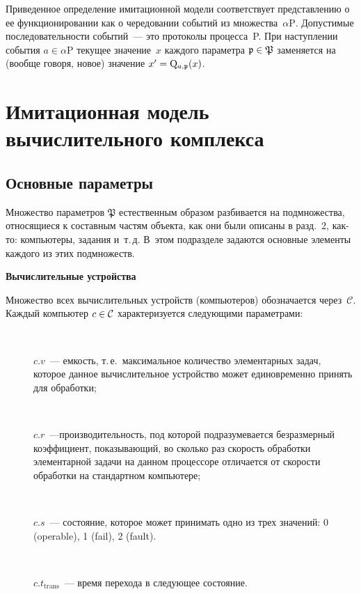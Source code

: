 \begin{multicols}{2}
    Приведенное определение имитационной модели соответствует 
представлению о ее функ\-ци\-онировании как о чередовании событий из 
мно\-жества~$\alpha \mathrm{P}$. Допустимые последовательности\linebreak 
    \mbox{событий}~--- это протоколы процесса~P. При наступлении события 
$a\in \alpha\mathrm{P}$ текущее значение~$x$ каждого параметра 
$\mathfrak{p}\hm\in\mathfrak{P}$ заменяется на (вообще говоря, новое) 
значение $x^\prime\hm=\mathrm{Q}_{a,\mathfrak{p}}(x)$.

\section{Имитационная модель вычислительного комплекса}

\subsection{Основные параметры}
    
    Множество параметров $\mathfrak{P}$ естественным образом 
разбивается на подмножества, относящиеся к составным частям объекта, как 
они были описаны в разд.~2, как-то: компьютеры, задания и~т.\,д. В~этом 
подразделе задаются основные элементы каждого из этих подмножеств.

\medskip
\textbf{Вычислительные устройства}
\smallskip

    Множество всех вычислительных устройств (компьютеров) 
обозначается через~$\mathcal{C}$. Каждый компьютер $c\hm\in \mathcal{C}$ характеризуется 
следующими па\-ра\-мет\-рами:
    \begin{description}
    \item[\,] $c.v$~--- емкость, т.\,е.\ максимальное количество 
элементарных задач, которое данное вычислительное устройство может 
единовременно принять для обработки;
    \item[\,] $c.r$~---производительность, под которой подразумевается 
безразмерный коэффициент, показывающий, во сколько раз скорость 
обработки элементарной задачи на данном процессоре отличается от 
скорости обработки на стандартном компьютере;
    \item[\,] $c.s$~--- состояние, которое может принимать одно из трех 
значений: 0 ({\sf operable}), 1 ({\sf fail}), 2 ({\sf fault}).
    \item[\,] $c.t_{\mathrm{trans}}$~--- время перехода в следующее 
состояние.
    \end{description}
    

\end{multicols}
